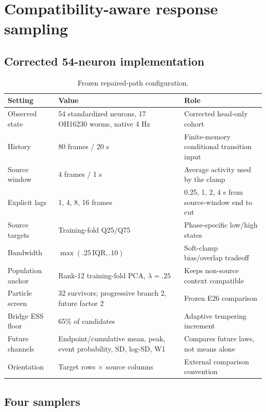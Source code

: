 \documentclass[10pt]{article}
\begin{document}
\section{Compatibility-aware response sampling}

\subsection{Corrected 54-neuron implementation}

\begin{table}[H]
\centering\small
\begin{tabularx}{\linewidth}{L{2.8cm}L{3.0cm}Y}
\toprule Setting & Value & Role \\
\midrule
Observed state & 54 standardized neurons, 17 OH16230 worms, native 4 Hz & Corrected head-only cohort \\
History & 80 frames / 20 s & Finite-memory conditional transition input \\
Source window & 4 frames / 1 s & Average activity used by the clamp \\
Explicit lags & 1, 4, 8, 16 frames & 0.25, 1, 2, 4 s from source-window end to cut \\
Source targets & Training-fold Q25/Q75 & Phase-specific low/high states \\
Bandwidth & $\max(.25\,\mathrm{IQR},.10)$ & Soft-clamp bias/overlap tradeoff \\
Population anchor & Rank-12 training-fold PCA, $\lambda=.25$ & Keeps non-source context compatible \\
Particle screen & 32 survivors; progressive branch 2, future factor 2 & Frozen E26 comparison \\
Bridge ESS floor & 65\% of candidates & Adaptive tempering increment \\
Future channels & Endpoint/cumulative mean, peak, event probability, SD, log-SD, W1 & Compares future laws, not means alone \\
Orientation & Target rows $\times$ source columns & External comparison convention \\
\bottomrule
\end{tabularx}
\caption{Frozen repaired-path configuration.}
\end{table}

\subsection{Four samplers}
\end{document}
